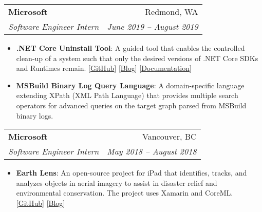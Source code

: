 \documentclass[letterpaper,11pt]{article}
\makeatletter
\newcommand{\resumeItem}[2]{
  \item\small{
    \textbf{#1}{: #2 \vspace{-2pt}}
  }
}
\newcommand{\resumeSubheading}[4]{
  \vspace{-1pt}\item
    \begin{tabular*}{0.97\textwidth}{l@{\extracolsep{\fill}}r}
      \textbf{#1} & #2 \\
      \textit{\small#3} & \textit{\small #4} \\
    \end{tabular*}\vspace{-5pt}
}
\newcommand{\resumeItemListStart}{\begin{itemize}}
\newcommand{\resumeItemListEnd}{\end{itemize}\vspace{-5pt}}
\makeatother
\begin{document}
    \resumeSubheading
      {Microsoft}{Redmond, WA}
      {Software Engineer Intern}{June 2019 -- August 2019}
      \resumeItemListStart
        \resumeItem{.NET Core Uninstall Tool}
          {A guided tool that enables the controlled clean-up of a system such that only the desired versions of .NET Core SDKs and Runtimes remain. [\href{https://github.com/dotnet/cli-lab}{GitHub}] [\href{https://devblogs.microsoft.com/dotnet/announcing-the-net-core-uninstall-tool-1-0/}{Blog}] [\href{https://docs.microsoft.com/dotnet/core/additional-tools/uninstall-tool}{Documentation}]}
        \resumeItem{MSBuild Binary Log Query Language}
          {A domain-specific language extending XPath (XML Path Language) that provides multiple search operators for advanced queries on the target graph parsed from MSBuild binary logs.}
      \resumeItemListEnd

    \resumeSubheading
      {Microsoft}{Vancouver, BC}
      {Software Engineer Intern}{May 2018 -- August 2018}
      \resumeItemListStart
        \resumeItem{Earth Lens}
          {An open-source project for iPad that identifies, tracks, and analyzes objects in aerial imagery to assist in disaster relief and environmental conservation. The project uses Xamarin and CoreML. [\href{https://github.com/microsoft/Earth-Lens}{GitHub}] [\href{https://www.microsoft.com/en-us/garage/blog/2018/10/new-garage-project-earth-lens-pairs-ai-with-aerial-imagery/}{Blog}]}
      \resumeItemListEnd


\end{document}
